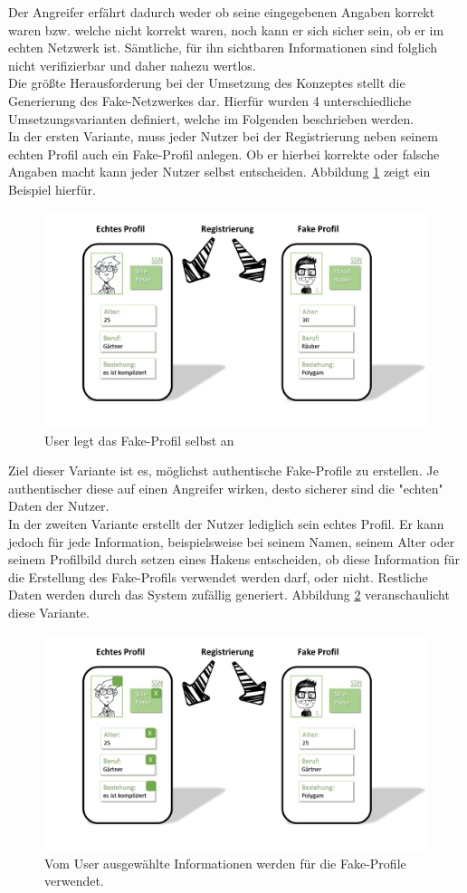 \documentclass{sigchi}
\begin{document}
Der Angreifer erfährt dadurch weder ob seine eingegebenen Angaben korrekt waren bzw. welche nicht korrekt waren, noch kann er sich sicher sein, ob er im echten Netzwerk ist. Sämtliche, für ihn sichtbaren Informationen sind folglich nicht verifizierbar und daher nahezu wertlos. \\
Die größte Herausforderung bei der Umsetzung des Konzeptes stellt die Generierung des Fake-Netzwerkes dar. Hierfür wurden 4 unterschiedliche Umsetzungsvarianten definiert, welche im Folgenden beschrieben werden. \\
In der ersten Variante, muss jeder Nutzer bei der Registrierung neben seinem echten Profil auch ein Fake-Profil anlegen. Ob er hierbei korrekte oder falsche Angaben macht kann jeder Nutzer selbst entscheiden. Abbildung \ref{fig:Umsetzung1} zeigt ein Beispiel hierfür. 
\begin{figure}[htbp]
\centering
\includegraphics[width=0.8\columnwidth]{figures/Umsetzung1.PNG}
\caption{User legt das Fake-Profil selbst an}
\label{fig:Umsetzung1}
\end{figure}
Ziel dieser Variante ist es, möglichst authentische Fake-Profile zu erstellen. Je authentischer diese auf einen Angreifer wirken, desto sicherer sind die "echten" Daten der Nutzer. \\
In der zweiten Variante erstellt der Nutzer lediglich sein echtes Profil. Er kann jedoch für jede Information, beispielsweise bei seinem Namen, seinem Alter oder seinem Profilbild durch setzen eines Hakens entscheiden, ob diese Information für die Erstellung des Fake-Profils verwendet werden darf, oder nicht. Restliche Daten werden durch das System zufällig generiert. Abbildung \ref{fig:Umsetzung2} veranschaulicht diese Variante. 
\begin{figure}[htbp]
\centering
	\includegraphics[width=0.8\columnwidth]{figures/Umsetzung2.PNG}
	\caption{Vom User ausgewählte Informationen werden für die Fake-Profile verwendet.}
	\label{fig:Umsetzung2}
\end{figure}
\end{document}
